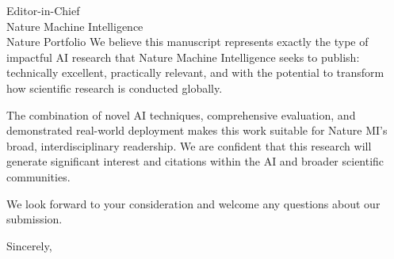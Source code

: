 \documentclass[11pt]{letter}
\begin{document}
\begin{letter}{Editor-in-Chief\\
Nature Machine Intelligence\\
Nature Portfolio}
We believe this manuscript represents exactly the type of impactful AI research that Nature Machine Intelligence seeks to publish: technically excellent, practically relevant, and with the potential to transform how scientific research is conducted globally.

The combination of novel AI techniques, comprehensive evaluation, and demonstrated real-world deployment makes this work suitable for Nature MI's broad, interdisciplinary readership. We are confident that this research will generate significant interest and citations within the AI and broader scientific communities.

We look forward to your consideration and welcome any questions about our submission.

\closing{Sincerely,}

\end{letter}
\end{document}
